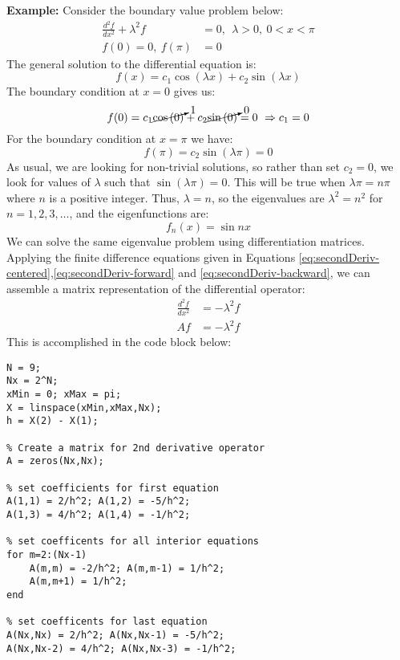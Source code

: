 \noindent\textbf{Example:} Consider the boundary value problem below:
\begin{align*}
\frac{d^2f}{dx^2} + \lambda^2 f &= 0, \ \ \lambda>0, \ 0<x<\pi \\
f(0) = 0, \ f(\pi) &= 0
\end{align*}
The general solution to the differential equation is:
\begin{equation*}
f(x) = c_1 \cos{(\lambda x)}+c_2\sin{(\lambda x)} 
\end{equation*}
The boundary condition at $x=0$ gives us:
\begin{equation*}
f(0) = c_1 \cancelto{1}{\cos{(0)}} + c_2 \cancelto{0}{\sin{(0)}} = 0 \ \Rightarrow c_1 = 0
\end{equation*}
For the boundary condition at $x = \pi$ we have:
\begin{equation*}
f(\pi) = c_2 \sin{(\lambda \pi)} = 0
\end{equation*}
As usual, we are looking for non-trivial solutions, so rather than set $c_2 = 0$, we look for values of $\lambda$ such that $\sin{(\lambda \pi)} = 0$. This will be true when $\lambda \pi = n \pi$ where $n$ is a positive integer. Thus, $\lambda = n$, so the eigenvalues are $\lambda^2 = n^2$ for $n=1,2,3,\dots$, and the eigenfunctions are:
\begin{equation}
f_n(x) = \sin{nx}
\label{eq:lec17n-ex2-eigenfunctions}
\end{equation}
We can solve the same eigenvalue problem using differentiation matrices.  Applying the finite difference equations given in Equations \ref{eq:secondDeriv-centered},\ref{eq:secondDeriv-forward} and \ref{eq:secondDeriv-backward}, we can assemble a matrix representation of the differential operator:
\begin{align*}
\frac{d^2f}{dx^2} &= -\lambda^2 f \\
Af &= -\lambda^2 f
\end{align*}
This is accomplished in the code block below:
\begin{lstlisting}[style=myMatlab,name=lec17n-ex2]
% discretize the spatial domain
N = 9;
Nx = 2^N;
xMin = 0; xMax = pi;
X = linspace(xMin,xMax,Nx);
h = X(2) - X(1);

% Create a matrix for 2nd derivative operator
A = zeros(Nx,Nx); 

% set coefficients for first equation
A(1,1) = 2/h^2; A(1,2) = -5/h^2;
A(1,3) = 4/h^2; A(1,4) = -1/h^2;

% set coefficents for all interior equations
for m=2:(Nx-1)
    A(m,m) = -2/h^2; A(m,m-1) = 1/h^2;
    A(m,m+1) = 1/h^2;
end

% set coefficents for last equation
A(Nx,Nx) = 2/h^2; A(Nx,Nx-1) = -5/h^2;
A(Nx,Nx-2) = 4/h^2; A(Nx,Nx-3) = -1/h^2;
\end{lstlisting}

